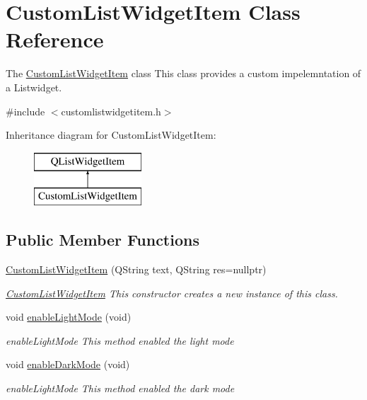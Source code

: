 \hypertarget{class_custom_list_widget_item}{}\section{Custom\+List\+Widget\+Item Class Reference}
\label{class_custom_list_widget_item}


The \mbox{\hyperlink{class_custom_list_widget_item}{Custom\+List\+Widget\+Item}} class This class provides a custom impelemntation of a Listwidget.  




{\ttfamily \#include $<$customlistwidgetitem.\+h$>$}

Inheritance diagram for Custom\+List\+Widget\+Item\+:\begin{figure}[H]
\begin{center}
\leavevmode
\includegraphics[height=2.000000cm]{class_custom_list_widget_item}
\end{center}
\end{figure}
\subsection*{Public Member Functions}
\begin{DoxyCompactItemize}
\item 
\mbox{\hyperlink{class_custom_list_widget_item_a7da08f342e6eeb0a2a4833c3031a9246}{Custom\+List\+Widget\+Item}} (Q\+String text, Q\+String res=nullptr)
\begin{DoxyCompactList}\small\item\em \mbox{\hyperlink{class_custom_list_widget_item}{Custom\+List\+Widget\+Item}} This constructor creates a new instance of this class. \end{DoxyCompactList}\item 
void \mbox{\hyperlink{class_custom_list_widget_item_a71d6b28f6e542c450807f2277ddacdc4}{enable\+Light\+Mode}} (void)
\begin{DoxyCompactList}\small\item\em enable\+Light\+Mode This method enabled the light mode \end{DoxyCompactList}\item 
void \mbox{\hyperlink{class_custom_list_widget_item_a97000c77f8c27f46c8ef2cc0ee824db0}{enable\+Dark\+Mode}} (void)
\begin{DoxyCompactList}\small\item\em enable\+Light\+Mode This method enabled the dark mode \end{DoxyCompactList}\end{DoxyCompactItemize}
